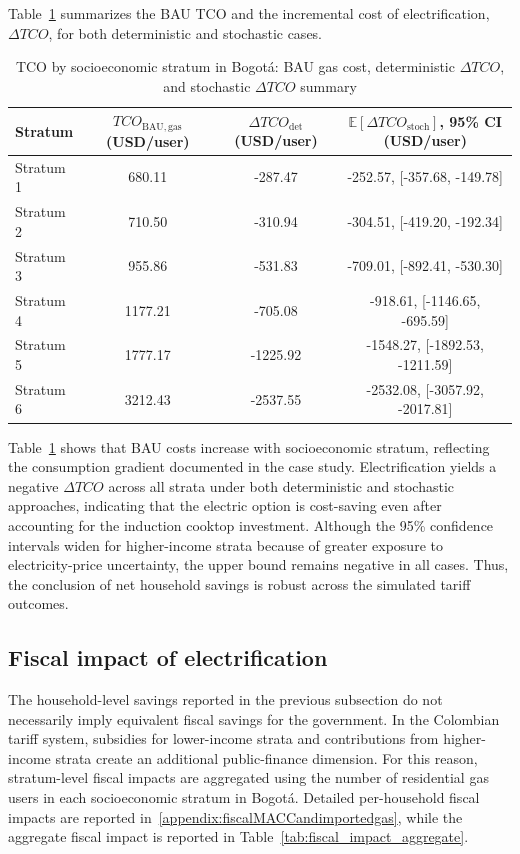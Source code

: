 \documentclass[authoryear,preprint,review,10pt]{elsarticle}
\begin{document}
Table~\ref{tab:tco_ci} summarizes the BAU TCO and the incremental cost of electrification, $\Delta TCO$, for both deterministic and stochastic cases.

\begin{table}[htbp]
\centering
\caption{TCO by socioeconomic stratum in Bogotá: BAU gas cost, deterministic $\Delta TCO$, and stochastic $\Delta TCO$ summary}
\label{tab:tco_ci}
\begin{tabular}{lccc}
\toprule
\textbf{Stratum} 
& $TCO_{\mathrm{BAU,gas}}$ (USD/user) 
& $\Delta TCO_{\mathrm{det}}$ (USD/user) 
& $\mathbb{E}[\Delta TCO_{\mathrm{stoch}}]$, 95\% CI (USD/user) \\
\midrule
Stratum 1 & 680.11  & -287.47  & -252.57, [-357.68, -149.78] \\
Stratum 2 & 710.50  & -310.94  & -304.51, [-419.20, -192.34] \\
Stratum 3 & 955.86  & -531.83  & -709.01, [-892.41, -530.30] \\
Stratum 4 & 1177.21 & -705.08  & -918.61, [-1146.65, -695.59] \\
Stratum 5 & 1777.17 & -1225.92 & -1548.27, [-1892.53, -1211.59] \\
Stratum 6 & 3212.43 & -2537.55 & -2532.08, [-3057.92, -2017.81] \\
\bottomrule
\end{tabular}
\end{table}

Table~\ref{tab:tco_ci} shows that BAU costs increase with socioeconomic stratum, reflecting the consumption gradient documented in the case study. Electrification yields a negative $\Delta TCO$ across all strata under both deterministic and stochastic approaches, indicating that the electric option is cost-saving even after accounting for the induction cooktop investment. Although the 95\% confidence intervals widen for higher-income strata because of greater exposure to electricity-price uncertainty, the upper bound remains negative in all cases. Thus, the conclusion of net household savings is robust across the simulated tariff outcomes.

\subsection{Fiscal impact of electrification}
\label{results:fiscal}

The household-level savings reported in the previous subsection do not necessarily imply equivalent fiscal savings for the government. In the Colombian tariff system, subsidies for lower-income strata and contributions from higher-income strata create an additional public-finance dimension. For this reason, stratum-level fiscal impacts are aggregated using the number of residential gas users in each socioeconomic stratum in Bogotá. Detailed per-household fiscal impacts are reported in~\ref{appendix:fiscalMACCandimportedgas}, while the aggregate fiscal impact is reported in Table~\ref{tab:fiscal_impact_aggregate}.
\end{document}
